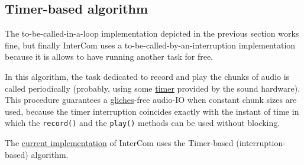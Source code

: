 \subsection{Timer-based algorithm}

The to-be-called-in-a-loop implementation depicted in the previous
section works fine, but finally InterCom uses a
to-be-called-by-an-interruption implementation because it is allows to
have running another task for free.

In this algorithm, the task dedicated to record and play the chunks of
audio is called periodically (probably, using some
\href{https://en.wikipedia.org/wiki/Timer}{timer} provided by the
sound hardware). This procedure guarantees a
\href{https://en.wikipedia.org/wiki/Glitch}{gliches}-free audio-IO
when constant chunk sizes are used, because the timer interruption
coincides exactly with the instant of time in which the
\verb|record()| and the \verb|play()| methods can be used without
blocking.
\begin{comment}
The following pseudo-code describes the new algorithm, which
is basically the previous one, except that the chunk size is fixed.

\begin{lstlisting}[language=Python,numbers=left]
  # Timer-based algorithm (to be called periodically)
  def record_IO_and_play(chunk_size):
     chunk = record(chunk_size)
     packed_chunk = pack(chunk)
     send(packed_chunk)
     packed_chunk = receive()
     chunk = unpack(packed_chunk)
     play(chunk)
\end{lstlisting}
\end{comment}


The
\href{https://github.com/Tecnologias-multimedia/InterCom/blob/master/src/minimal.py#L111}{current
  implementation} of InterCom uses the Timer-based
(interruption-based) algorithm.

